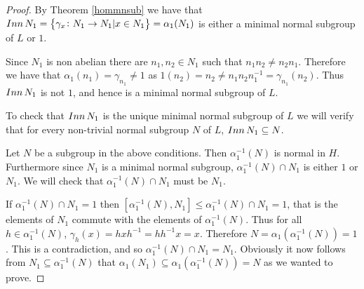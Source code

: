 \begin{proof}
    By Theorem \ref{hommnsub} we have that $Inn\, {N}_1 = \left\{ \gamma_x \colon N_1 \rightarrow N_1 | x \in N_1 \right\} = \alpha_1(N_1)$ is either a minimal normal subgroup of $L$ or $1$. 
    
    Since $N_1$ is non abelian there are $n_1, n_2 \in N_1$ such that $n_1n_2 \neq n_2n_1$. Therefore we have that $\alpha_1(n_1) = \gamma_{n_1} \neq 1$ as $1(n_2) = n_2 \neq n_1n_2n_1^{-1} = \gamma_{n_1}(n_2)$. Thus $Inn\, {N}_1$ is not $1$, and hence is a minimal normal subgroup of $L$.

    To check that $Inn\, {N}_1$ is the unique minimal normal subgroup of $L$ we will verify that for every non-trivial normal subgroup $N$ of $L$, $Inn\, {N}_1 \subseteq N$. 
    
    Let $N$ be a subgroup in the above conditions. Then $\alpha_1^{-1}(N)$ is normal in $H$. Furthermore since $N_1$ is a minimal normal subgroup, $\alpha_1^{-1}(N) \cap N_1$ is either $1$ or $N_1$. We will check that $\alpha_1^{-1}(N) \cap N_1$ must be $N_1$.

    If $\alpha_1^{-1}(N) \cap N_1 = 1$ then $[\alpha_1^{-1}(N), N_1] \le \alpha_1^{-1}(N) \cap N_1 = 1$, that is the elements of $N_1$ commute with the elements of $\alpha_1^{-1}(N)$. Thus for all $h \in \alpha_1^{-1}(N)$, $\gamma_h(x) = hxh^{-1} = hh^{-1}x = x$. Therefore $N = \alpha_1(\alpha_1^{-1}(N)) = 1$. This is a contradiction, and so $\alpha_1^{-1}(N) \cap N_1 = N_1$.
    Obviously it now follows from $N_1 \subseteq \alpha_1^{-1}(N)$ that $\alpha_1(N_1) \subseteq \alpha_1(\alpha_1^{-1}(N)) = N$ as we wanted to prove.
\end{proof}

